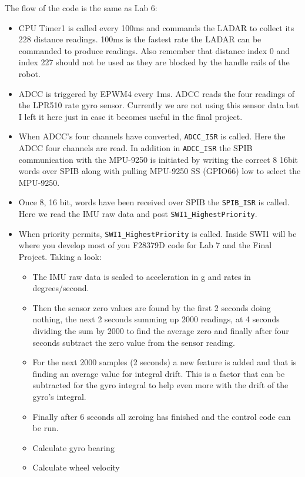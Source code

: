 \documentclass[11pt]{article}
\begin{document}
The flow of the code is the same as Lab 6:
%
\begin{itemize}
    \item CPU Timer1 is called every 100ms and commands the LADAR to collect its 228 distance readings. 100ms is the fastest rate the LADAR can be commanded to produce readings. Also remember that distance index 0 and index 227 should not be used as they are blocked by the handle rails of the robot.
    \item ADCC is triggered by EPWM4 every 1ms. ADCC reads the four readings of the LPR510 rate gyro sensor. Currently we are not using this sensor data but I left it here just in case it becomes useful in the final project.
        \item When ADCC’s four channels have converted, \texttt{ADCC_ISR} is called. Here the ADCC four channels are read. In addition in \texttt{ADCC_ISR} the SPIB communication with the MPU-9250 is initiated by writing the correct 8 16bit words over SPIB along with pulling MPU-9250 SS (GPIO66) low to select the MPU-9250.
        \item Once 8, 16 bit, words have been received over SPIB the \texttt{SPIB_ISR} is called. Here we read the IMU raw data and post \texttt{SWI1_HighestPriority}.
        \item When priority permits, \texttt{SWI1_HighestPriority} is called. Inside SWI1 will be where you develop most of you F28379D code for Lab 7 and the Final Project. Taking a look:
        \begin{itemize}
            \item The IMU raw data is scaled to acceleration in g and rates in degrees/second.
            \item Then the sensor zero values are found by the first 2 seconds doing nothing, the next 2 seconds summing up 2000 readings, at 4 seconds dividing the sum by 2000 to find the average zero and finally after four seconds subtract the zero value from the sensor reading.
            \item For the next 2000 samples (2 seconds) a new feature is added and that is finding an average value for integral drift. This is a factor that can be subtracted for the gyro integral to help even more with the drift of the gyro’s integral.
            \item Finally after 6 seconds all zeroing has finished and the control code can be run.
            \item Calculate gyro bearing
            \item Calculate wheel velocity

\end{itemize}
\end{itemize}
\end{document}
